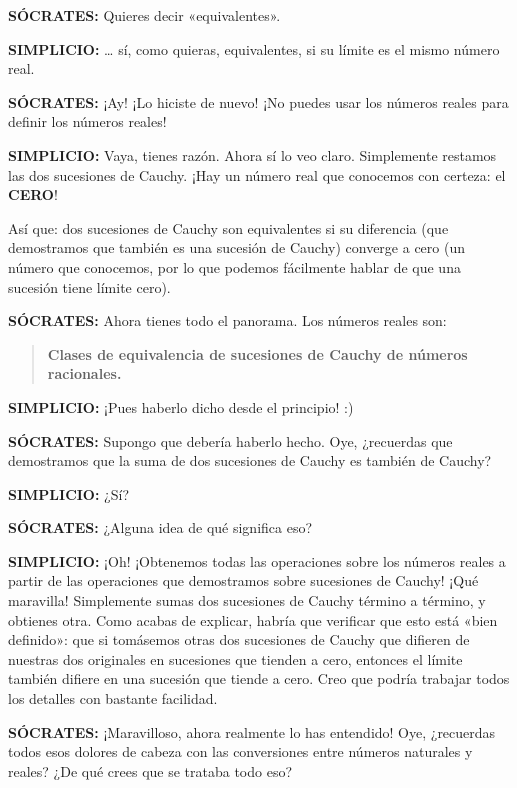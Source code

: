 \medskip
\noindent\textbf{SÓCRATES:} Quieres decir «equivalentes».

\medskip
\noindent\textbf{SIMPLICIO:} \ldots{} sí, como quieras, equivalentes, si su límite es el mismo número real.

\medskip
\noindent\textbf{SÓCRATES:} ¡Ay! ¡Lo hiciste de nuevo! ¡No puedes usar los números reales para definir los números reales!

\medskip
\noindent\textbf{SIMPLICIO:} Vaya, tienes razón. Ahora sí lo veo claro. Simplemente restamos las dos sucesiones de Cauchy. ¡Hay un número real que conocemos con certeza: el \textbf{CERO}!

Así que: dos sucesiones de Cauchy son equivalentes si su diferencia (que demostramos que también es una sucesión de Cauchy) converge a cero (un número que conocemos, por lo que podemos fácilmente hablar de que una sucesión tiene límite cero).

\medskip
\noindent\textbf{SÓCRATES:} Ahora tienes todo el panorama. Los números reales son:

\begin{quote}
  \centering
  \large\textbf{Clases de equivalencia de sucesiones de Cauchy de números racionales.}
\end{quote}

\medskip
\noindent\textbf{SIMPLICIO:} ¡Pues haberlo dicho desde el principio! :)

\medskip
\noindent\textbf{SÓCRATES:} Supongo que debería haberlo hecho. Oye, ¿recuerdas que demostramos que la suma de dos sucesiones de Cauchy es también de Cauchy?

\medskip
\noindent\textbf{SIMPLICIO:} ¿Sí?

\medskip
\noindent\textbf{SÓCRATES:} ¿Alguna idea de qué significa eso?

\medskip
\noindent\textbf{SIMPLICIO:} ¡Oh! ¡Obtenemos todas las operaciones sobre los números reales a partir de las operaciones que demostramos sobre sucesiones de Cauchy! ¡Qué maravilla! Simplemente sumas dos sucesiones de Cauchy término a término, y obtienes otra. Como acabas de explicar, habría que verificar que esto está «bien definido»: que si tomásemos otras dos sucesiones de Cauchy que difieren de nuestras dos originales en sucesiones que tienden a cero, entonces el límite también difiere en una sucesión que tiende a cero. Creo que podría trabajar todos los detalles con bastante facilidad.

\medskip
\noindent\textbf{SÓCRATES:} ¡Maravilloso, ahora realmente lo has entendido! Oye, ¿recuerdas todos esos dolores de cabeza con las conversiones entre números naturales y reales? ¿De qué crees que se trataba todo eso?

